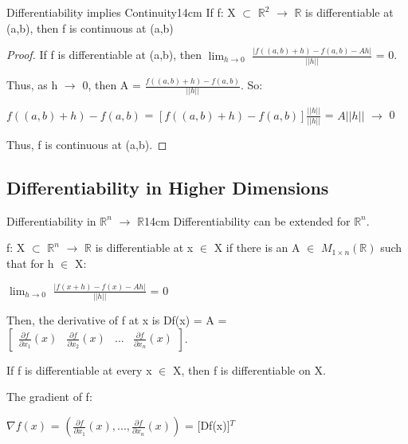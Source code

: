     \newpage



    \begin{wtheorem}{Differentiability implies Continuity}{14cm}
        If f: X $\subset$ $\mathbb{R}^2$ $\rightarrow$ $\mathbb{R}$
        is differentiable at (a,b), then f is continuous at (a,b)
    \end{wtheorem}

    \begin{proof}
        If f is differentiable at (a,b), then
        $\lim_{h \rightarrow 0}$ $\frac{|f((a,b)+h)-f(a,b)-Ah|}{||h||}$ = 0.

        Thus, as h $\rightarrow$ 0, then A = $\frac{f((a,b)+h) - f(a,b)}{||h||}$.
        So:
        
        \hspace{0.5cm}
        $f((a,b)+h) - f(a,b)$
        = $[f((a,b)+h) - f(a,b)] \frac{||h||}{||h||}$
        = $A||h||$
        $\rightarrow$ 0

        Thus, f is continuous at (a,b).
    \end{proof}

    \vspace{0.5cm}





\subsection{ Differentiability in Higher Dimensions }

    \begin{definition}{Differentiability in $\mathbb{R}^n$
    $\rightarrow$ $\mathbb{R}$}{14cm}
        Differentiability can be extended for $\mathbb{R}^n$.

        f: X $\subset$ $\mathbb{R}^n$ $\rightarrow$ $\mathbb{R}$
        is differentiable at x $\in$ X if there is an
        A $\in$ $M_{1 \times n}(\mathbb{R})$ such that for h $\in$ X:

        \hspace{0.5cm}
        $\lim_{h \rightarrow 0}$ $\frac{|f(x+h)-f(x)-Ah|}{||h||}$ = 0

        Then, the derivative of f at x is Df(x) = A =
        $
        \begin{bmatrix}
            \frac{\partial f}{\partial x_1}(x)
            & \frac{\partial f}{\partial x_2}(x)
            & ...
            & \frac{\partial f}{\partial x_n}(x)
        \end{bmatrix}
        $.

        If f is differentiable at every x $\in$ X, then f is differentiable on X.

        \vspace{0.5cm}

        The {\color{lblue} gradient} of f:

        \hspace{0.5cm}
        $\nabla f(x)$
        = $(\frac{\partial f}{\partial x_1}(x)
            ,...,\frac{\partial f}{\partial x_n}(x))$
        = [Df(x)]$^T$
    \end{definition}

